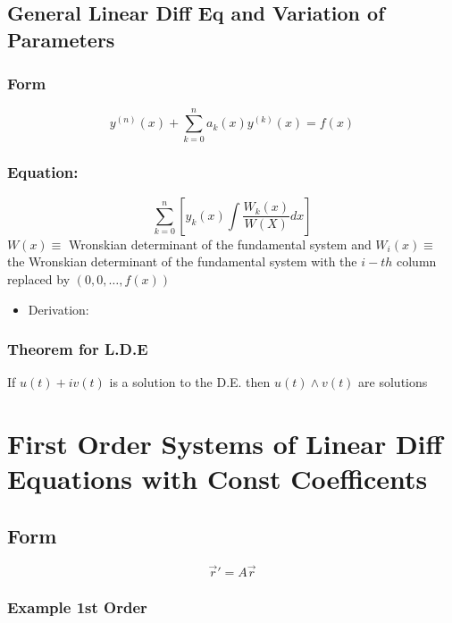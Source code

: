 \documentclass[11pt]{article}
\begin{document}
\subsection{General Linear Diff Eq and Variation of Parameters}
\label{sec-9-3}
\subsubsection{Form}
\label{sec-9-3-1}

    \begin{equation}
    y^{(n)}(x)+\sum_{k=0}^na_k(x)y^{(k)}(x)=f(x)
    \end{equation}
\subsubsection{Equation:}
\label{sec-9-3-2}

    \begin{equation}
    \sum_{k=0}^n[y_k(x)\int{\frac{W_k(x)}{W(X)}dx}]
    \end{equation}
    $W(x)\equiv$ Wronskian determinant of the fundamental system
    and $W_i(x)\equiv$ the Wronskian determinant of the fundamental system
    with the $i-th$ column replaced by $(0,0,\ldots,f(x))$
\begin{itemize}

\item Derivation:
\label{sec-9-3-2-1}%

\end{itemize} %
\subsubsection{Theorem for L.D.E}
\label{sec-9-3-3}

    If $u(t)+iv(t)$ is a solution to the D.E. then $u(t) \wedge v(t)$
    are solutions
\section{First Order Systems of Linear Diff Equations with Const Coefficents}
\label{sec-10}
\subsection{Form}
\label{sec-10-1}

   \begin{equation}
   \vec{r}' = A\vec{r}
   \end{equation}
\subsubsection{Example 1st Order}
\label{sec-10-1-1}
\end{document}

